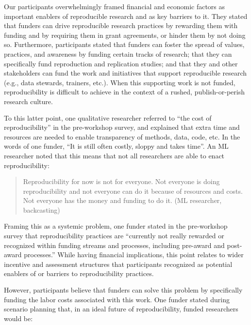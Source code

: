 \documentclass[authordate, meta]{jote-new-article}
\begin{document}
	Our participants overwhelmingly framed financial and economic factors as important enablers of reproducible research and as key barriers to it. They stated that funders can drive reproducible research practices by rewarding them with funding and by requiring them in grant agreements, or hinder them by not doing so. Furthermore, participants stated that funders can foster the spread of values, practices, and awareness by funding certain tracks of research; that they can specifically fund reproduction and replication studies; and that they and other stakeholders can fund the work and initiatives that support reproducible research (e.g., data stewards, trainers, etc.). When this supporting work is not funded, reproducibility is difficult to achieve in the context of a rushed, publish-or-perish research culture.







	To this latter point, one qualitative researcher referred to “the cost of reproducibility” in the pre-workshop survey, and explained that extra time and resources are needed to enable transparency of methods, data, code, etc. In the words of one funder, “It is still often costly, sloppy and takes time”. An ML researcher noted that this means that not all researchers are able to enact reproducibility:



	\begin{quote}Reproducibility for now is not for everyone. Not everyone is doing reproducibility and not everyone can do it because of resources and costs. Not everyone has the money and funding to do it. (ML researcher, backcasting)\end{quote}



	Framing this as a systemic problem, one funder stated in the pre-workshop survey that reproducibility practices are “currently not really rewarded or recognized within funding streams and processes, including pre-award and post-award processes.” While having financial implications, this point relates to wider incentive and assessment structures that participants recognized as potential enablers of or barriers to reproducibility practices.







	However, participants believe that funders can solve this problem by specifically funding the labor costs associated with this work. One funder stated during scenario planning that, in an ideal future of reproducibility, funded researchers would be:
\end{document}
